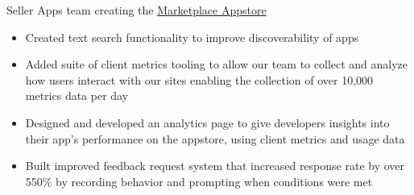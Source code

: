 \documentclass[11pt,letterpaper,ragged2e,withhyper]{altacv}
\newif\ifbubbles
\begin{document}
\begin{paracol}{2}








\switchcolumn


\par Seller Apps team creating the \href{https://sellercentral.amazon.com/apps/store}{\color{accent} Marketplace Appstore}
\begin{itemize}
    \item Created text search functionality to improve discoverability of apps
    \item Added suite of client metrics tooling to allow our team to collect and analyze how users interact with our sites enabling the collection of over 10,000 metrics data per day
    \item Designed and developed an analytics page to give developers insights into their app's performance on the appstore, using client metrics and usage data
    \item Built improved feedback request system that increased response rate by over 550\% by recording behavior and prompting when conditions were met
\end{itemize}

\ifbubbles
    \cvtag{TypeScript}
    \cvtag{Java}
    \cvtag{React}
    \cvtag{Redux}
    \cvtag{AWS}
    \cvtag{Jest}
    \cvtag{Enzyme}
    \cvtag{REST}
\fi

\divider


\end{paracol}
\end{document}
